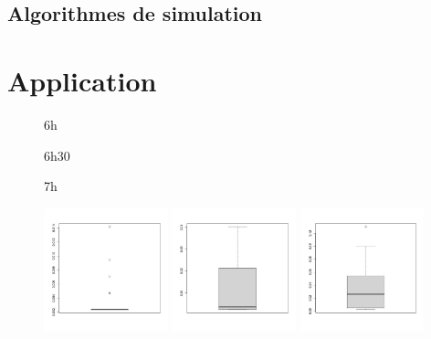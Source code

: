 
\label{annexe:code}
\section{Algorithmes de simulation}



\chapter{Application}


\begin{figure}[H]
	\centering
	\begin{minipage}{0.32\textwidth}
		\centering
		6h
	\end{minipage}
	\begin{minipage}{0.32\textwidth}
		\centering
		6h30
	\end{minipage}
	\begin{minipage}{0.32\textwidth}
		\centering
		7h
	\end{minipage}
	\begin{minipage}{\linewidth}
		\centering
		\includegraphics[width=0.32\textwidth]{Images/pv_pre/6h.png}
		\includegraphics[width=0.32\textwidth]{Images/pv_pre/06:30:00.jpg}
		\includegraphics[width=0.32\textwidth]{Images/pv_pre/07:00:00.jpg}

\end{minipage}
\end{figure}
